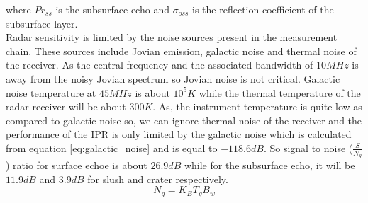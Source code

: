 where $Pr_{ss}$ is the subsurface echo and $\sigma_{oss}$ is the reflection coefficient of the subsurface layer.\\
Radar sensitivity is limited by the noise sources present in the measurement chain. These sources include Jovian emission, galactic noise and thermal noise of the receiver.  As the central frequency and the associated bandwidth of $10 MHz$ is away from the noisy Jovian spectrum so Jovian noise is not critical. Galactic noise temperature at $45 MHz$ is about $10^{5}K$ while the thermal temperature of the radar receiver will be about  $300 K$. As, the instrument temperature is quite low as compared to galactic noise so, we can ignore thermal noise of the receiver and the performance of the \ac{IPR} is only limited by the galactic noise which is calculated from equation \ref{eq:galactic_noise} and is equal to $-118.6 dB$. So signal to noise ($\frac{S}{N_{g}}$) ratio for surface echoe is about $26.9 dB$ while for the subsurface echo, it will be $11.9 dB$ and $3.9 dB$ for slush and crater respectively.
\begin{equation}
N_{g} = K_{B}T_{g}B_{w}
\label{eq:galactic_noise}
\end{equation}
\\



